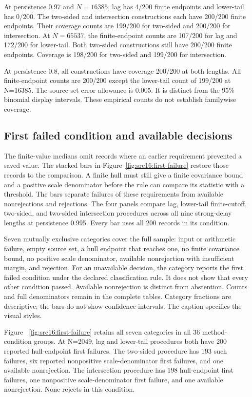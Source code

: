 At persistence 0.97 and $N=16385$, lag has 4/200 finite endpoints and lower-tail has 0/200. The two-sided and intersection constructions each have 200/200 finite endpoints. Their coverage counts are 199/200 for two-sided and 200/200 for intersection. At $N=65537$, the finite-endpoint counts are 107/200 for lag and 172/200 for lower-tail. Both two-sided constructions still have 200/200 finite endpoints. Coverage is 198/200 for two-sided and 199/200 for intersection.

At persistence 0.8, all constructions have coverage 200/200 at both lengths. All finite-endpoint counts are 200/200 except the lower-tail count of 199/200 at N=16385. The source-set error allowance is 0.005. It is distinct from the 95\% binomial display intervals. These empirical counts do not establish familywise coverage.

\subsection{First failed condition and available decisions}\label{sec:src16:first-failure}

The finite-value medians omit records where an earlier requirement prevented a saved value. The stacked bars in Figure~\ref{fig:src16:first-failure} restore those records to the comparison. A finite hull must still give a finite covariance bound and a positive scale denominator before the rule can compare its statistic with a threshold. The bars separate failures of these requirements from available nonrejections and rejections. The four panels compare lag, lower-tail finite-cutoff, two-sided, and two-sided intersection procedures across all nine strong-delay lengths at persistence 0.995. Every bar uses all 200 records in its condition.

Seven mutually exclusive categories cover the full sample: input or arithmetic failure, empty source set, a hull endpoint that reaches one, no finite covariance bound, no positive scale denominator, available nonrejection with insufficient margin, and rejection. For an unavailable decision, the category reports the first failed condition under the declared classification rule. It does not show that every other condition passed. Available nonrejection is distinct from abstention. Counts and full denominators remain in the complete tables. Category fractions are descriptive; the bars do not show confidence intervals. The caption specifies the visual styles.

Figure ~\ref{fig:src16:first-failure} retains all seven categories in all 36 method-condition groups. At N=2049, lag and lower-tail procedures both have 200 reported hull-endpoint first failures. The two-sided procedure has 193 such failures, six reported nonpositive scale-denominator first failures, and one available nonrejection. The intersection procedure has 198 hull-endpoint first failures, one nonpositive scale-denominator first failure, and one available nonrejection. None rejects in this condition.

